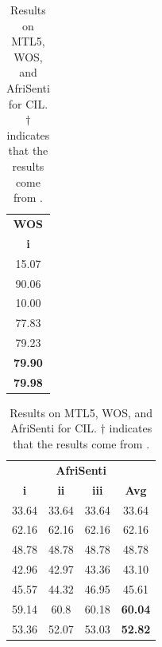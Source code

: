 \documentclass[11pt]{article}
\begin{document}
\begin{table}[]
\begin{tabular}{c}
\hline
\textbf{WOS}              \\
\textbf{i}              \\
\hline
15.07                     \\
90.06                     \\
\hline
10.00                     \\
77.83                    \\
79.23                     \\
\textbf{79.90}                     \\
\textbf{79.98}                    \\
\hline
\end{tabular}
\begin{tabular}{cccc}
\hline
\multicolumn{4}{c}{\textbf{AfriSenti}}                                                                       \\
\textbf{i}               & \textbf{ii}                & \textbf{iii}                & \textbf{Avg}              \\
\hline
33.64                    & 33.64                     & 33.64                     & 33.64                     \\
62.16                    & 62.16                     & 62.16                     & 62.16                     \\
\hline
48.78                    & 48.78                     & 48.78                     & 48.78                     \\
42.96                    & 42.97                     & 43.36                     & 43.10                     \\
45.57                    & 44.32                     & 46.95                     & 45.61                     \\
59.14                    & 60.8                      & 60.18                     & \textbf{60.04}                     \\
53.36                    & 52.07                     & 53.03                     & \textbf{52.82}                    \\
\hline
\end{tabular}
\caption{Results on MTL5, WOS, and AfriSenti for CIL. $\dagger$ indicates that the results come from \cite{wang2024rehearsalfree}.}
\label{tab:cil}
\end{table}
\end{document}
